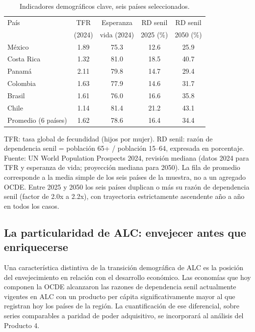 \documentclass[12pt, letterpaper]{article}
\begin{document}
\begin{table}[h!]
\centering
\caption{Indicadores demográficos clave, seis países seleccionados.}
\label{tab:demog}
\small
\begin{tabular}{lcccc}
\toprule
País & TFR & Esperanza & RD senil & RD senil \\
     & (2024) & vida (2024) & 2025 (\%) & 2050 (\%) \\
\midrule
México       & 1.89 & 75.3 & 12.6 & 25.9 \\
Costa Rica   & 1.32 & 81.0 & 18.5 & 40.7 \\
Panamá       & 2.11 & 79.8 & 14.7 & 29.4 \\
Colombia     & 1.63 & 77.9 & 14.6 & 31.7 \\
Brasil       & 1.61 & 76.0 & 16.6 & 35.8 \\
Chile        & 1.14 & 81.4 & 21.2 & 43.1 \\
\midrule
Promedio (6 países) & 1.62 & 78.6 & 16.4 & 34.4 \\
\bottomrule
\end{tabular}

\smallskip
\footnotesize
TFR: tasa global de fecundidad (hijos por mujer). RD senil: razón de dependencia
senil = población 65+ / población 15--64, expresada en porcentaje. Fuente: UN World
Population Prospects 2024, revisión mediana (datos 2024 para TFR y esperanza de vida;
proyección mediana para 2050). La fila de promedio corresponde a la media simple de
los seis países de la muestra, no a un agregado OCDE. Entre 2025 y 2050 los seis
países duplican o más su razón de dependencia senil (factor de 2.0x a 2.2x), con
trayectoria estrictamente ascendente año a año en todos los casos.
\end{table}

\subsection{La particularidad de ALC: envejecer antes que enriquecerse}

Una característica distintiva de la transición demográfica de ALC es la posición
del envejecimiento en relación con el desarrollo económico. Las economías que hoy
componen la OCDE alcanzaron las razones de dependencia senil actualmente vigentes
en ALC con un producto per cápita significativamente mayor al que registran hoy
los países de la región. La cuantificación de ese diferencial, sobre series
comparables a paridad de poder adquisitivo, se incorporará al análisis del
Producto 4.
\end{document}
